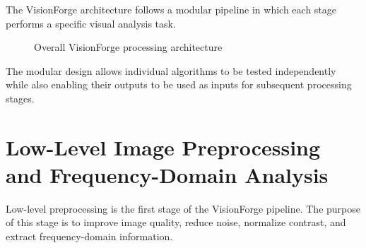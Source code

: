 \documentclass[11pt,a4paper]{article}
\begin{document}
The VisionForge architecture follows a modular pipeline in which each stage performs a specific visual analysis task.

\begin{figure}[H]
    \centering
    \caption{Overall VisionForge processing architecture}
    \label{fig:architecture}
\end{figure}

The modular design allows individual algorithms to be tested independently while also enabling their outputs to be used as inputs for subsequent processing stages.


\section{Low-Level Image Preprocessing and Frequency-Domain Analysis}

Low-level preprocessing is the first stage of the VisionForge pipeline. The purpose of this stage is to improve image quality, reduce noise, normalize contrast, and extract frequency-domain information.

\end{document}
